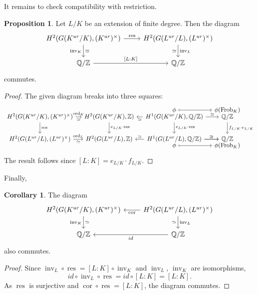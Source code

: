 \documentclass[class=article, crop=false]{standalone}
\newcommand{\ZZ}{\mathbb{Z}}
\newcommand{\QQ}{\mathbb{Q}}
\newcommand{\Frob}{\operatorname{Frob}}
\newcommand{\res}{\operatorname{res}}
\newcommand{\cor}{\operatorname{cor}}
\newcommand{\inv}{\operatorname{inv}}
\newcommand{\ord}{\operatorname{ord}}
\theoremstyle{definition}
\newtheorem{proposition}{Proposition}[section]
\newtheorem{corollary}{Corollary}[section]
\begin{document}
It remains to check compatibility with restriction.
\begin{proposition}
	Let $L/K$ be an extension of finite degree. Then the diagram
	\[
	\begin{tikzcd}
		H^{2}(G(K^{ur}/K),(K^{ur})^{\times})\ar{r}{\res}\ar[d,"\inv_K"',"\simeq"] & H^{2}(G(L^{ur}/L),(L^{ur})^{\times})\ar[d,"\inv_L","\simeq"']\\
		\QQ/\ZZ\ar{r}{[L:K]} & \QQ/\ZZ
	\end{tikzcd}
	\] 
	commutes.
\end{proposition}
\begin{proof}
	The given diagram breaks into three squares:
	\[
	\begin{tikzcd}[column sep=1em]
		&&\phi\ar[r,mapsto] & \phi(\Frob_K)\\[-25pt]
		H^2(G(K^{ur}/K),(K^{ur})^{\times})\ar[r,"\ord_K","\simeq"']\ar[d,"\res"] & H^2(G(K^{ur}/K),\ZZ)\ar[d,"e_{L/K}\cdot\res"] & H^{1}(G(K^{ur}/K),\QQ/\ZZ)\ar[l,"\simeq"]\ar[d,"e_{L/K}\cdot\res"]\ar[r,"\simeq"]& \QQ/\ZZ\ar[d,"f_{L/K}\cdot e_{L/K}"]\\
		H^{2}(G(L^{ur}/L),(L^{ur})^{\times})\ar[r,"\ord_L","\simeq"'] & H^2(G(L^{ur}/L),\ZZ) & H^{1}(G(L^{ur}/L),\QQ/\ZZ)\ar[l,"\simeq"']\ar[r,"\simeq"]\ar[r,"\simeq"] & \QQ/\ZZ\\[-25pt]
		&&\phi\ar[r,mapsto] & \phi(\Frob_K)
	\end{tikzcd}
	\] 
	The result follows since $[L:K]=e_{L/K}\cdot f_{L/K}$.
\end{proof}
Finally,
\begin{corollary}
	The diagram
	\[
	\begin{tikzcd}
		H^{2}(G(K^{ur}/K),(K^{ur})^{\times})\ar[d,"\inv_K"',"\simeq"] & H^{2}(G(L^{ur}/L),(L^{ur})^{\times})\ar[l,"\cor"]\ar[d,"\inv_L","\simeq"']\\
		\QQ/\ZZ & \QQ/\ZZ\ar[l,"id"]
	\end{tikzcd}
	\] 
	also commutes.
\end{corollary}
\begin{proof}
	Since $\inv_L\circ\res=[L:K]\circ\inv_K$ and $\inv_L$, $\inv_K$ are isomorphisms,
	\[
		id\circ\inv_L\circ\res=id\circ[L:K]=[L:K]
	.\] 
	As $\res$ is surjective and $\cor\circ\res=[L:K]$, the diagram commutes.
\end{proof}
\end{document}
